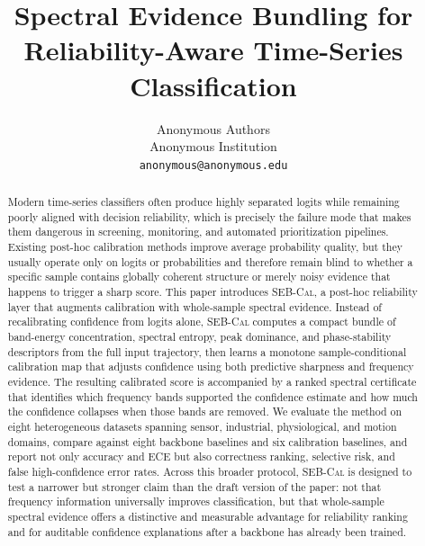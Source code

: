 \documentclass{article}
\title{Spectral Evidence Bundling for Reliability-Aware Time-Series Classification}
\author{
Anonymous Authors\\
Anonymous Institution\\
\texttt{anonymous@anonymous.edu}
}
\newcommand{\method}{\textsc{SEB-Cal}}
\begin{document}
\maketitle

\begin{abstract}
Modern time-series classifiers often produce highly separated logits while remaining poorly aligned with decision reliability, which is precisely the failure mode that makes them dangerous in screening, monitoring, and automated prioritization pipelines. Existing post-hoc calibration methods improve average probability quality, but they usually operate only on logits or probabilities and therefore remain blind to whether a specific sample contains globally coherent structure or merely noisy evidence that happens to trigger a sharp score. This paper introduces \method{}, a post-hoc reliability layer that augments calibration with whole-sample spectral evidence. Instead of recalibrating confidence from logits alone, \method{} computes a compact bundle of band-energy concentration, spectral entropy, peak dominance, and phase-stability descriptors from the full input trajectory, then learns a monotone sample-conditional calibration map that adjusts confidence using both predictive sharpness and frequency evidence. The resulting calibrated score is accompanied by a ranked spectral certificate that identifies which frequency bands supported the confidence estimate and how much the confidence collapses when those bands are removed. We evaluate the method on eight heterogeneous datasets spanning sensor, industrial, physiological, and motion domains, compare against eight backbone baselines and six calibration baselines, and report not only accuracy and ECE but also correctness ranking, selective risk, and false high-confidence error rates. Across this broader protocol, \method{} is designed to test a narrower but stronger claim than the draft version of the paper: not that frequency information universally improves classification, but that whole-sample spectral evidence offers a distinctive and measurable advantage for reliability ranking and for auditable confidence explanations after a backbone has already been trained.
\end{abstract}
\end{document}
